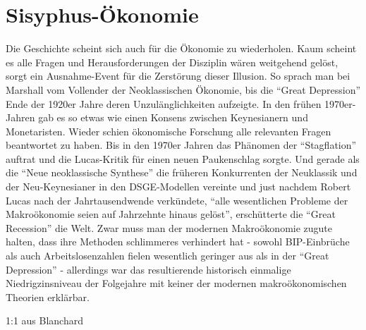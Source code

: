 %
%
%

\chapter{Sisyphus-Ökonomie}

Die Geschichte scheint sich auch für die Ökonomie zu wiederholen. Kaum scheint es alle Fragen und Herausforderungen der Disziplin wären weitgehend gelöst, sorgt ein Ausnahme-Event für die Zerstörung dieser Illusion. So sprach man bei Marshall vom Vollender der Neoklassischen Ökonomie, bis die "`Great Depression"' Ende der 1920er Jahre deren Unzulänglichkeiten aufzeigte. In den frühen 1970er-Jahren gab es so etwas wie einen Konsens zwischen Keynesianern und Monetaristen. Wieder schien ökonomische Forschung alle relevanten Fragen beantwortet zu haben. Bis in den 1970er Jahren das Phänomen der "`Stagflation"' auftrat und die Lucas-Kritik für einen neuen Paukenschlag sorgte. Und gerade als die "`Neue neoklassische Synthese"' die früheren Konkurrenten der Neuklassik und der Neu-Keynesianer in den DSGE-Modellen vereinte und just nachdem Robert Lucas nach der Jahrtausendwende verkündete, "`alle wesentlichen Probleme der Makroökonomie seien auf Jahrzehnte hinaus gelöst"', erschütterte die "`Great Recession"' die Welt. Zwar muss man der modernen Makroökonomie zugute halten, dass ihre Methoden schlimmeres verhindert hat - sowohl BIP-Einbrüche als auch Arbeitslosenzahlen fielen wesentlich geringer aus als in der "`Great Depression"' - allerdings war das resultierende historisch einmalige Niedrigzinsniveau der Folgejahre mit keiner der modernen makroökonomischen Theorien erklärbar.


1:1 aus Blanchard

